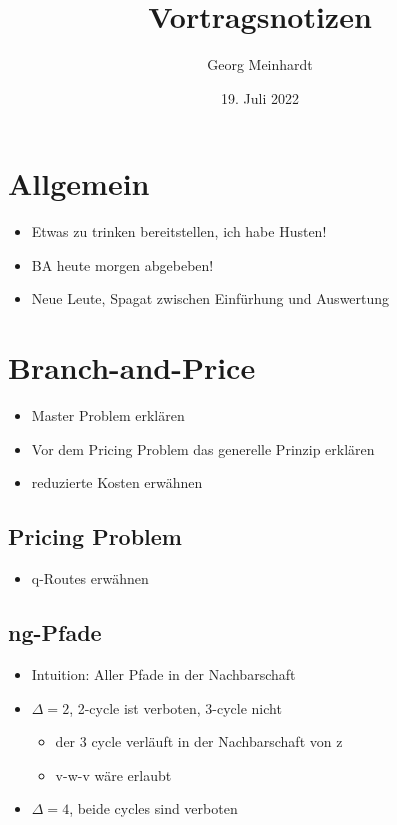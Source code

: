 \documentclass{article}
\title{Vortragsnotizen}
\author{Georg Meinhardt}
\date{19. Juli 2022}
\begin{document}
\maketitle
\section*{Allgemein}
\begin{itemize}
    \item Etwas zu trinken bereitstellen, ich habe Husten!
    \item BA heute morgen abgebeben!
    \item Neue Leute, Spagat zwischen Einfürhung und Auswertung
\end{itemize}

\section*{Branch-and-Price}
\begin{itemize}
    \item Master Problem erklären
    \item Vor dem Pricing Problem das generelle Prinzip erklären
    \item reduzierte Kosten erwähnen
\end{itemize}

\subsection*{Pricing Problem}
\begin{itemize}
    \item q-Routes erwähnen
\end{itemize}

\subsection*{ng-Pfade}
\begin{itemize}
    \item Intuition: Aller Pfade in der Nachbarschaft
    \item $\Delta = 2$, 2-cycle ist verboten, 3-cycle nicht
    \begin{itemize}
        \item der 3 cycle verläuft in der Nachbarschaft von z
        \item v-w-v wäre erlaubt
    \end{itemize}
    \item $\Delta = 4$, beide cycles sind verboten
\end{itemize}
\end{document}

